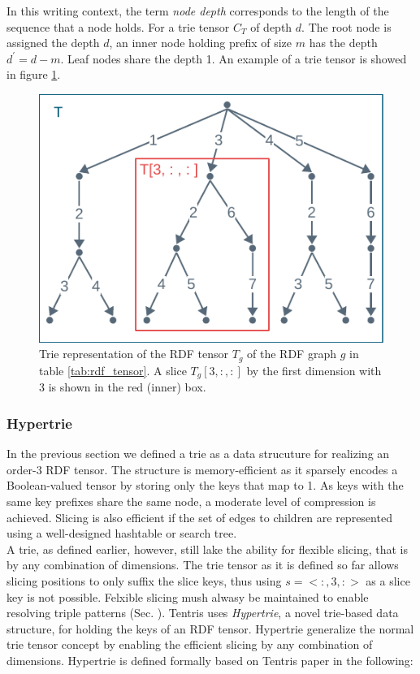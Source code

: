 In this writing context, the term \textit{node depth} corresponds to the length of the sequence that a node holds. For a trie tensor $C_T$ of depth $d$. The root node is assigned the depth $d$, an inner node holding prefix of size $m$ has the depth $d^{'}=d-m$. Leaf nodes share the depth 1. An example of a trie tensor is showed in figure \ref{fig:rdf_trie}.  \\

\begin{figure}[h]
	\centering
	\includegraphics{figures/chapter2/trie4}
	\caption{Trie representation of the RDF tensor $T_g$ of the RDF graph $g$ in table \ref{tab:rdf_tensor}. A slice $T_g[3, :, :]$ by the first dimension with 3 is shown in the red (inner) box.}
	\label{fig:rdf_trie}
\end{figure}
\clearpage


\subsubsection{Hypertrie}
\label{sec:hypertrie_pre}
In the previous section we defined a trie as a data strucuture for realizing an order-3 RDF tensor. The structure is memory-efficient as it sparsely encodes a Boolean-valued tensor by storing only the keys that map to 1. As keys with the same key prefixes share the same node, a moderate level of compression is achieved. Slicing is also efficient if the set of edges to children are represented using a well-designed hashtable or search tree\cite{bras}. \\

A trie, as defined earlier, however, still lake the ability for flexible slicing, that is by any combination of dimensions. The trie tensor as it is defined so far allows slicing positions to only suffix the slice keys, thus using $s = <:, 3, :>$ as a slice key is not possible. Felxible slicing mush alwasy be maintained to enable resolving triple patterns (Sec. ). Tentris uses \textit{Hypertrie}, a novel trie-based data structure, for holding the keys of an RDF tensor. Hypertrie generalize the normal trie tensor concept by enabling the efficient slicing by any combination of dimensions. Hypertrie is defined formally based on Tentris paper \cite{tentris2020} in the following:\\

